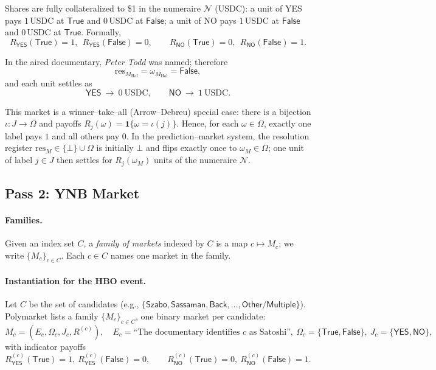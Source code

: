 Shares are fully collateralized to \$1 in the numeraire $\mathcal{N}$ (USDC): a unit of \textsf{YES} pays $1$\,USDC at $\mathsf{True}$ and $0$\,USDC at $\mathsf{False}$; a unit of \textsf{NO} pays $1$\,USDC at $\mathsf{False}$ and $0$\,USDC at $\mathsf{True}$. Formally,
\[
R_{\textsf{YES}}(\mathsf{True})=1,\ \ R_{\textsf{YES}}(\mathsf{False})=0,\qquad
R_{\textsf{NO}}(\mathsf{True})=0,\ \ R_{\textsf{NO}}(\mathsf{False})=1.
\]

In the aired documentary, \emph{Peter Todd} was named; therefore
\[
\mathrm{res}_{M_{\mathrm{Hal}}}=\omega_{M_{\mathrm{Hal}}}=\mathsf{False},
\]
and each unit settles as
\[
\textsf{YES}\ \to\ 0\ \text{USDC},\qquad
\textsf{NO}\ \to\ 1\ \text{USDC}.
\]


This market is a winner--take--all (Arrow--Debreu) special case: there is a bijection $\iota:J\to\Omega$ and payoffs
$R_j(\omega)=\mathbf{1}\{\omega=\iota(j)\}$. Hence, for each $\omega\in\Omega$, exactly one label pays $1$ and all others pay $0$.
In the prediction--market system, the resolution register $\mathrm{res}_M\in\{\bot\}\cup\Omega$ is initially $\bot$ and flips exactly once to $\omega_M\in\Omega$; one unit of label $j\in J$ then settles for $R_j(\omega_M)$ units of the numeraire $\mathcal{N}$.


\subsection{Pass 2: YNB Market}

\paragraph{Families.}
Given an index set $C$, a \emph{family of markets} indexed by $C$ is a map $c\mapsto M_c$; we write $\{M_c\}_{c\in C}$. Each $c\in C$ names one market in the family.

\paragraph{Instantiation for the HBO event.}
Let $C$ be the set of candidates (e.g., $\{\textsf{Szabo},\textsf{Sassaman},\textsf{Back},\dots,\textsf{Other/Multiple}\}$).
Polymarket lists a family $\{M_c\}_{c\in C}$, one binary market per candidate:
\[
  M_c=(E_c,\Omega_c,J_c,R^{(c)}),\quad
  E_c=\text{``The documentary identifies $c$ as Satoshi''},\ 
  \Omega_c=\{\mathsf{True},\mathsf{False}\},\
  J_c=\{\textsf{YES},\textsf{NO}\},
\]
with indicator payoffs
\[
  R^{(c)}_{\textsf{YES}}(\mathsf{True})=1,\ R^{(c)}_{\textsf{YES}}(\mathsf{False})=0,\qquad
  R^{(c)}_{\textsf{NO}}(\mathsf{True})=0,\ R^{(c)}_{\textsf{NO}}(\mathsf{False})=1.
\]

